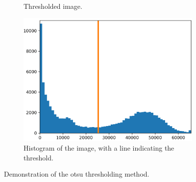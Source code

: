 \documentclass[
  digital,     %
  oneside,     %
  nosansbold,  %
  nocolorbold, %
  lof,         %
  lot,         %
]{fithesis4}
\begin{document}
\begin{figure}
\begin{subfigure}[t]{0.45\textwidth}
        \caption{Thresholded image.}
        \label{fig:otsu-thresholded}
    \end{subfigure}
    \begin{subfigure}[t]{0.6\textwidth}
        \centering
        \includegraphics[width=\textwidth]{resources/otsu-histogram.png}
        \caption{Histogram of the image, with a line indicating the threshold.}
        \label{fig:otsu-histogram}
    \end{subfigure}
    \caption{Demonstration of the otsu thresholding method.}
    \label{fig:otsu-demonstration}
\end{figure}
\end{document}

